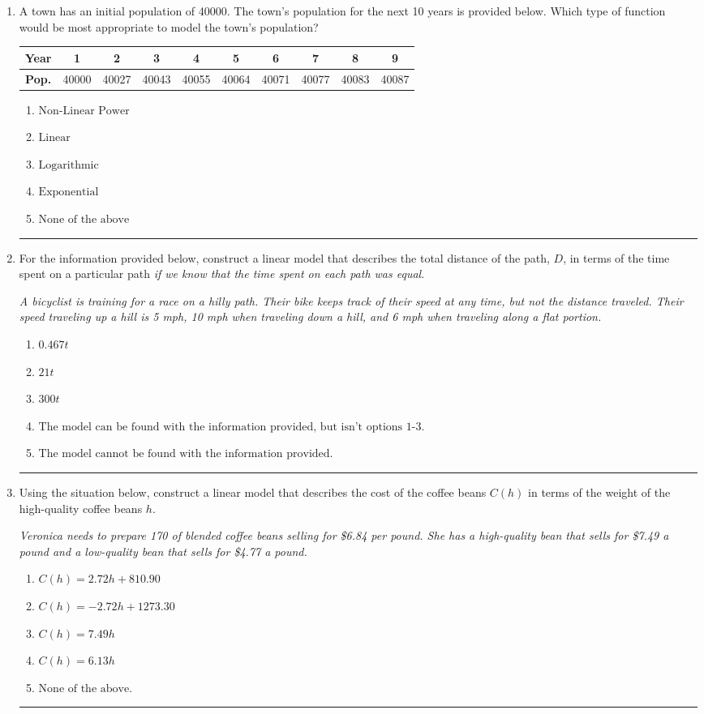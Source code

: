 \documentclass[14pt]{extbook}
\newcommand{\litem}[1]{\item#1\hspace*{-1cm}\rule{\textwidth}{0.4pt}}
\begin{document}
\begin{enumerate}
\litem{
A town has an initial population of 40000. The town's population for the next 10 years is provided below. Which type of function would be most appropriate to model the town's population?


\begin{tabular}{c|c|c|c|c|c|c|c|c|c}
\textbf{Year} & 1 & 2 & 3 & 4 & 5 & 6 & 7 & 8 & 9 \tabularnewline
\hline
\textbf{Pop.} & 40000 & 40027 & 40043 & 40055 & 40064 & 40071 & 40077 & 40083 & 40087
\end{tabular} \begin{enumerate}[label=\Alph*.]
\item \( \text{Non-Linear Power} \)
\item \( \text{Linear} \)
\item \( \text{Logarithmic} \)
\item \( \text{Exponential} \)
\item \( \text{None of the above} \)

\end{enumerate} }
\litem{
For the information provided below, construct a linear model that describes the total distance of the path, $D$, in terms of the time spent on a particular path \textit{if we know that the time spent on each path was equal}.
\begin{center}
    \textit{ A bicyclist is training for a race on a hilly path. Their bike keeps track of their speed at any time, but not the distance traveled. Their speed traveling up a hill is 5 mph, 10 mph when traveling down a hill, and 6 mph when traveling along a flat portion. }
\end{center}
\begin{enumerate}[label=\Alph*.]
\item \( 0.467 t \)
\item \( 21 t \)
\item \( 300 t \)
\item \( \text{The model can be found with the information provided, but isn't options 1-3.} \)
\item \( \text{The model cannot be found with the information provided.} \)

\end{enumerate} }
\litem{
Using the situation below, construct a linear model that describes the cost of the coffee beans $C(h)$ in terms of the weight of the high-quality coffee beans $h$.
\begin{center}
    \textit{ Veronica needs to prepare 170 of blended coffee beans selling for \$6.84 per pound. She has a high-quality bean that sells for \$7.49 a pound and a low-quality bean that sells for \$4.77 a pound. }
\end{center}
\begin{enumerate}[label=\Alph*.]
\item \( C(h) = 2.72 h + 810.90 \)
\item \( C(h) = -2.72 h + 1273.30 \)
\item \( C(h) = 7.49 h \)
\item \( C(h) = 6.13 h \)
\item \( \text{None of the above.} \)


\end{enumerate}}
\end{enumerate}
\end{document}
